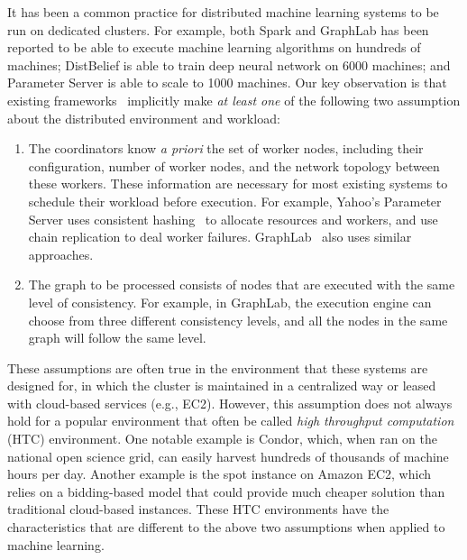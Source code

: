 \documentclass[11pt]{article}
\begin{document}
It has been a common practice for distributed machine
learning systems to be run on dedicated clusters.
For example, both Spark and GraphLab has been 
reported to be able to execute machine learning algorithms
on hundreds of machines; DistBelief is able to 
train deep neural network on 6000 machines; and 
Parameter Server is able to scale to 1000 machines.
Our key observation is that existing frameworks~\cite{Li:2014:OSDI,
GraphLab:OSDI,Spark,Google,Yahoo} implicitly
make {\em at least one} of the following two assumption
about the distributed environment and workload:

\begin{enumerate}
\item The coordinators know {\em a priori} 
the set of worker nodes, including their configuration,
number of worker nodes, and the network topology between
these workers. These information are necessary for most
existing systems to schedule their workload before
execution. For example, Yahoo's Parameter Server
uses consistent hashing~\cite{Li:2014:OSDI} to allocate
resources and workers, and use chain replication to
deal worker failures. GraphLab~\cite{GraphLab:OSDI} also
uses similar approaches. 
\item The graph to be processed consists of nodes that are 
executed with the same level of consistency. For example,
in GraphLab, the execution engine can choose from three
different consistency levels, and all the nodes in the same
graph will follow the same level.  
\end{enumerate}

These assumptions are often true in the environment that
these systems are designed for, in which the cluster is
maintained in a centralized way or leased with cloud-based
services (e.g., EC2). However, this assumption
does not always hold for a popular environment that
often be called {\em high throughput computation} (HTC) 
environment. One notable example is Condor, which,
when ran on the national open science grid, can easily
harvest hundreds of thousands of machine hours per day.
Another example is the spot instance on Amazon EC2, which 
relies on a bidding-based model that could provide much
cheaper solution than traditional cloud-based instances.
These HTC environments have the characteristics that are
different to the above two assumptions when applied to 
machine learning.
\end{document}

